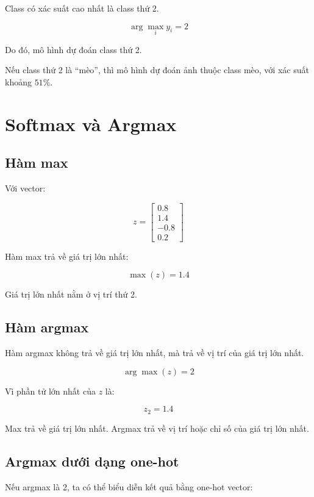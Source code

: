 \documentclass[12pt,a4paper]{report}
\begin{document}
Class có xác suất cao nhất là class thứ 2.

\[
    \arg\max_i y_i = 2
\]

Do đó, mô hình dự đoán class thứ 2.

\begin{vidu}
Nếu class thứ 2 là ``mèo'', thì mô hình dự đoán ảnh thuộc class mèo, với xác suất khoảng $51\%$.
\end{vidu}

\chapter{Softmax và Argmax}

\section{Hàm max}

Với vector:

\[
    z =
    \begin{bmatrix}
    0.8\\
    1.4\\
    -0.8\\
    0.2
    \end{bmatrix}
\]

Hàm max trả về giá trị lớn nhất:

\[
    \max(z)=1.4
\]

Giá trị lớn nhất nằm ở vị trí thứ 2.

\section{Hàm argmax}

Hàm argmax không trả về giá trị lớn nhất, mà trả về vị trí của giá trị lớn nhất.

\[
    \arg\max(z)=2
\]

Vì phần tử lớn nhất của $z$ là:

\[
    z_2=1.4
\]

\begin{ghinho}
Max trả về giá trị lớn nhất. Argmax trả về vị trí hoặc chỉ số của giá trị lớn nhất.
\end{ghinho}

\section{Argmax dưới dạng one-hot}

Nếu argmax là 2, ta có thể biểu diễn kết quả bằng one-hot vector:
\end{document}
